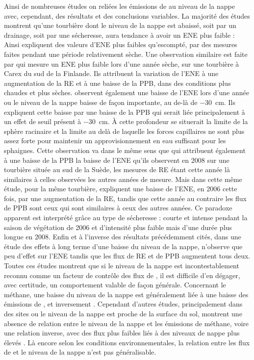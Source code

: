 Ainsi de nombreuses études on reliées les émissions de \coo au niveau de la nappe avec, cependant, des résultats et des conclusions variables.
La majorité des études montrent qu'une tourbière dont le niveau de la nappe est abaissé, soit par un drainage, soit par une sécheresse, aura tendance à avoir un ENE plus faible :
Ainsi \citet{strack2013} expliquent des valeurs d'ENE plus faibles qu'escompté, par des mesures faites pendant une période relativement sèche.
Une observation similaire est faite par \citet{aurela2007} qui mesure un ENE plus faible lors d'une année sèche, sur une tourbière à Carex du sud de la Finlande.
Ils attribuent la variation de l'ENE à une augmentation de la RE et à une baisse de la PPB, dans des conditions plus chaudes et plus sèches.
\citet{peichl2014} observent également une baisse de l'ENE lors d'une année ou le niveau de la nappe baisse de façon importante, au de-là de \SI{-30}{\centi\metre}.
Ils expliquent cette baisse par une baisse de la PPB qui serait liée principalement à un effet de seuil présent à \SI{-30}{\centi\metre}.
À cette profondeur se situerait la limite de la sphère racinaire et la limite au delà de laquelle les forces capillaires ne sont plus assez forte pour maintenir un approvisionnement en eau suffisant pour les sphaignes.
Cette observation va dans le même sens que \citet{lund2012} qui attribuent également à une baisse de la PPB la baisse de l'ENE qu'ils observent en 2008 sur une tourbière située au sud de la Suède, les mesures de RE étant cette année là similaires à celles observées les autres années de mesure.
Mais dans cette même étude, pour la même tourbière, \citet{lund2012} expliquent une baisse de l'ENE, en 2006 cette fois, par une augmentation de la RE, tandis que cette année au contraire les flux de PPB sont ceux qui sont similaires à ceux des autres années.
Ce paradoxe apparent est interprété grâce au type de sécheresse : courte et intense pendant la saison de végétation de 2006 et d'intensité plus faible mais d'une durée plus longue en 2008.
Enfin et à l'inverse des résultats précédemment cités, \citet{ballantyne2014} dans une étude des effets à long terme d'une baisse du niveau de la nappe, n'observe que peu d'effet sur l'ENE tandis que les flux de RE et de PPB augmentent tous deux.
Toutes ces études montrent que si le niveau de la nappe est incontestablement reconnu comme un facteur de contrôle des flux de \coo, il est difficile d'en dégager, avec certitude, un comportement valable de façon générale.
Concernant le méthane, une baisse du niveau de la nappe est généralement liée à une baisse des émissions de \chh, et inversement \citep{strack2006,pelletier2007,turetsky2008}.
Cependant d'autres études, principalement dans des sites ou le niveau de la nappe est proche de la surface du sol, montrent une absence de relation entre le niveau de la nappe et les émissions de méthane, voire une relation inverse, avec des flux plus faibles liés à des niveaux de nappe plus élevés \citep{kettunen1996,bellisario1999,treat2007}.
Là encore selon les conditions environnementales, la relation entre les flux de \chh et le niveau de la nappe n'est pas généralisable.

